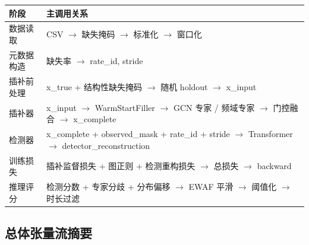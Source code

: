\documentclass[11pt,a4paper]{ctexart}
\newcommand{\code}[1]{{\ttfamily\small #1}}
\begin{document}
\begin{center}
\begin{tabularx}{\textwidth}{@{}L{3.2cm}Y@{}}
\toprule
阶段 & 主调用关系 \\
\midrule
数据读取 & CSV $\rightarrow$ 缺失掩码 $\rightarrow$ 标准化 $\rightarrow$ 窗口化 \\
元数据构造 & 缺失率 $\rightarrow$ \code{rate\_id}, \code{stride} \\
插补前处理 & \code{x\_true} + 结构性缺失掩码 $\rightarrow$ 随机 holdout $\rightarrow$ \code{x\_input} \\
插补器 & \code{x\_input} $\rightarrow$ \code{WarmStartFiller} $\rightarrow$ GCN 专家 / 频域专家 $\rightarrow$ 门控融合 $\rightarrow$ \code{x\_complete} \\
检测器 & \code{x\_complete} + \code{observed\_mask} + \code{rate\_id} + \code{stride} $\rightarrow$ Transformer $\rightarrow$ \code{detector\_reconstruction} \\
训练损失 & 插补监督损失 + 图正则 + 检测重构损失 $\rightarrow$ 总损失 $\rightarrow$ backward \\
推理评分 & 检测分数 + 专家分歧 + 分布偏移 $\rightarrow$ EWAF 平滑 $\rightarrow$ 阈值化 $\rightarrow$ 时长过滤 \\
\bottomrule
\end{tabularx}
\end{center}

\subsection{总体张量流摘要}
\end{document}
